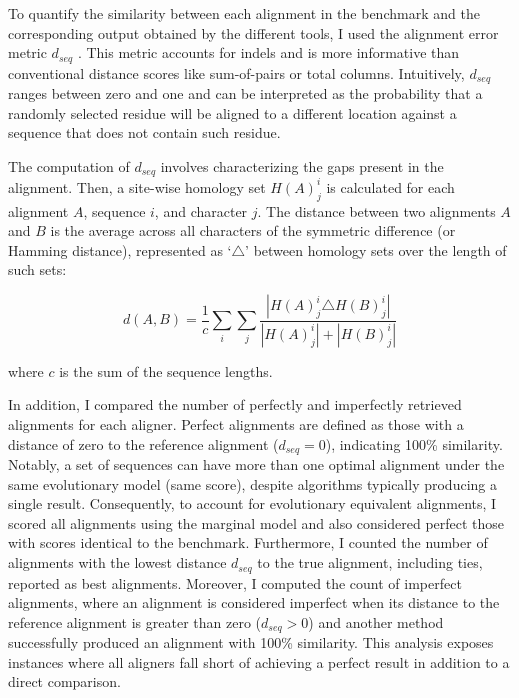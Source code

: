 \documentclass[12pt,letterpaper]{article}
\newcommand{\cyan}[1]{\textcolor{cyan}{#1}}
\begin{document}
To quantify the similarity between each alignment in the benchmark and the corresponding output obtained by the different tools, I used the alignment error metric $d_{seq}$ \citep{metrics_blackburne_whelan_2011}. This metric accounts for indels and is more informative than conventional distance scores like sum-of-pairs or total columns. Intuitively, $d_{seq}$ ranges between zero and one and can be interpreted as the probability that a randomly selected residue will be aligned to a different location against a sequence that does not contain such residue.

The computation of $d_{seq}$ involves characterizing the gaps present in the alignment. Then, a site-wise homology set $H(A)^i_j$ is calculated for each alignment $A$, sequence $i$, and character $j$. The distance between two alignments $A$ and $B$ is the average across all characters of the symmetric difference (or Hamming distance), represented as `$\triangle$' between homology sets over the length of such sets:

\begin{equation}
d(A,B) = \frac{1}{c} \sum_i \sum_j \frac{|H(A)^i_j \triangle H(B)^i_j|}{|H(A)^i_j|+|H(B)^i_j|}
\end{equation}

\noindent where $c$ is the sum of the sequence lengths.

In addition, I compared the number of perfectly and imperfectly retrieved alignments for each aligner. Perfect alignments are defined as those with a distance of zero to the reference alignment ($d_{seq} = 0$), indicating 100\% similarity. Notably, a set of sequences can have more than one optimal alignment under the same evolutionary model (same score), despite algorithms typically producing a single result. Consequently, to account for evolutionary equivalent alignments, I scored all alignments using the marginal model and also considered perfect those with scores identical to the benchmark.
Furthermore, I counted the number of alignments with the lowest distance $d_{seq}$ to the true alignment, including ties, reported as best alignments. Moreover, I computed the count of imperfect alignments, where an alignment is considered imperfect when its distance to the reference alignment is greater than zero ($d_{seq} > 0$) and another method successfully produced an alignment with 100\% similarity. This analysis exposes instances where all aligners fall short of achieving a perfect result in addition to a direct comparison.

\end{document}
